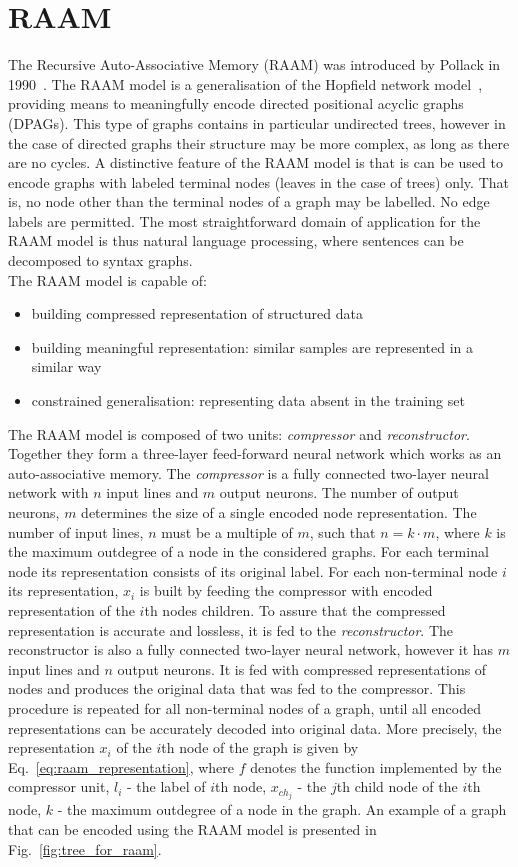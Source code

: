 \section{RAAM}
The Recursive Auto-Associative Memory (RAAM) was introduced by Pollack in 1990~\cite{pollack1990recursive}. The RAAM model is a generalisation of the Hopfield network model~\cite{goulon2005hopfield}, providing means to meaningfully encode directed positional acyclic graphs (DPAGs). This type of graphs contains in particular undirected trees, however in the case of directed graphs their structure may be more complex, as long as there are no cycles. A distinctive feature of the RAAM model is that is can be used to encode graphs with labeled terminal nodes (leaves in the case of trees) only. That is, no node other than the terminal nodes of a graph may be labelled. No edge labels are permitted. The most straightforward domain of application for the RAAM model is thus natural language processing, where sentences can be decomposed to syntax graphs.\\
\noindent The RAAM model is capable of:
\begin{itemize}
	\item building compressed representation of structured data
	\item building meaningful representation: similar samples are represented in a similar way
	\item constrained generalisation: representing data absent in the training set
\end{itemize}
The RAAM model is composed of two units: \emph{compressor} and \emph{reconstructor}. Together they form a three-layer feed-forward neural network which works as an auto-associative memory. The \emph{compressor} is a fully connected two-layer neural network with $n$ input lines and $m$ output neurons. The number of output neurons, $m$ determines the size of a single encoded node representation. The number of input lines, $n$ must be a multiple of $m$, such that $n = k \cdot m$, where $k$ is the maximum outdegree of a node in the considered graphs. For each terminal node its representation consists of its original label. For each non-terminal node $i$ its representation, $x_i$ is built by feeding the compressor with encoded representation of the $i$th nodes children. To assure that the compressed representation is accurate and lossless, it is fed to the \emph{reconstructor}. The reconstructor is also a fully connected two-layer neural network, however it has $m$ input lines and $n$ output neurons. It is fed with compressed representations of nodes and produces the original data that was fed to the compressor. This procedure is repeated for all non-terminal nodes of a graph, until all encoded representations can be accurately decoded into original data. More precisely, the representation $x_i$ of the $i$th node of the graph is given by Eq.~\ref{eq:raam_representation}, where $f$ denotes the function implemented by the compressor unit, $l_i$ - the label of $i$th node, $x_{ch_j}$ - the $j$th child node of the $i$th node, $k$ - the maximum outdegree of a node in the graph. An example of a graph that can be encoded using the RAAM model is presented in Fig.~\ref{fig:tree_for_raam}.

